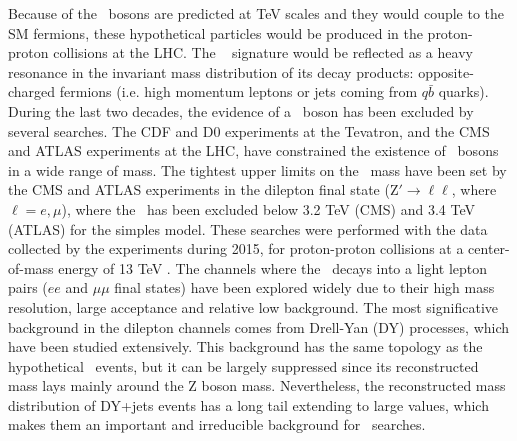 Because of the \Zprime~bosons are predicted at TeV scales and they would couple to the SM fermions, 
these hypothetical particles would be produced in the proton-proton collisions at the LHC. The \Zprime~ 
signature would be reflected as a heavy resonance in the invariant mass distribution of its 
decay products: opposite-charged fermions (i.e. high momentum leptons or jets coming from $q\bar{b}$ quarks). During 
the last two decades, the evidence of a \Zprime~boson has been excluded by several searches. 
The CDF\cite{CDFZprimedielectronbib,CDFZprimedimuonbib,CDFZprimeditaubib,CDFZprimeditopbib}  
and D0\cite{D0Zprimesearchesbib,D0Zprimetodielectronbib,D0Zprimeditopbib} experiments at the Tevatron, and
the CMS\cite{CMSZprime2dileptonbib,CMSZprime2ditaubib,CMSZprime2ditauelectronmuonbib,CMSZprime2toptop,CMSZprime2bbbib,CMSZprime2dijetbib} 
and ATLAS \cite{ATLASZprime2dileptonbib,ATLASZprime2ditaubib,ATLASZprime2toptopbib} experiments at the LHC, have 
constrained the existence of \Zprime~bosons in a wide range of mass. The tightest 
upper limits on the \Zprime~mass have been set by the CMS and ATLAS experiments in the dilepton final 
state (Z$'\rightarrow \ell\ell$, where $\ell=e, \mu$), where the \Zprime~has been excluded below 3.2 TeV (CMS) and 3.4 TeV (ATLAS)
for the simples model. These searches were performed with the data collected by the experiments during 2015, for proton-proton 
collisions at a center-of-mass energy of 13 TeV \cite{CMSZprime2dileptonbib,ATLASZprime2dileptonbib}. The channels
where the \Zprime~decays into a light lepton pairs ($ee$ and $\mu\mu$ final states) have been explored
widely due to their high mass resolution, large acceptance and relative low background. The most significative 
background in the dilepton channels comes from Drell-Yan (DY) processes, which have been studied extensively. This 
background has the same topology as the hypothetical \Zprime~events, but it can be largely 
suppressed since its reconstructed mass lays mainly around the Z boson mass. Nevertheless, the 
reconstructed mass distribution of DY+jets events has a long tail extending to large values, which 
makes them an important and irreducible background for \Zprime~searches.  \\

